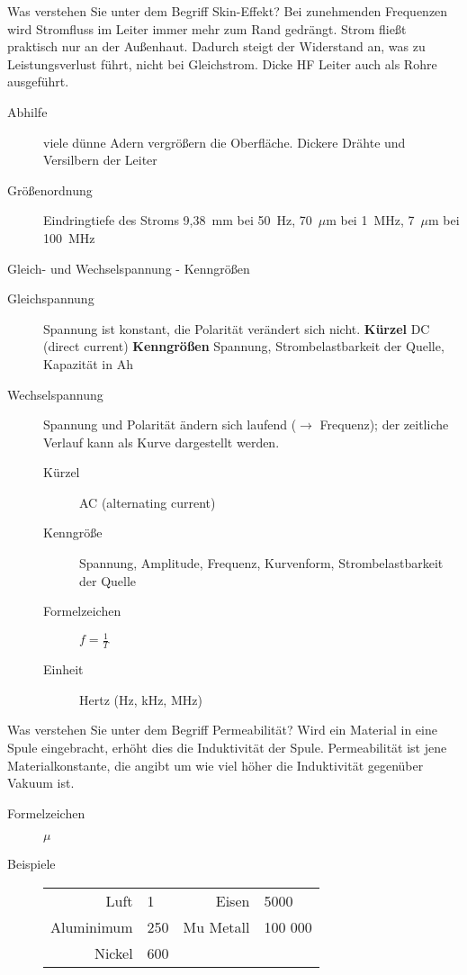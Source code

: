\documentclass[avery5371,grid,frame,a4paper]{flashcards}
\newcommand{\card}[3]{
  \begin{flashcard}[{\chap} -- #1]{#2}#3\end{flashcard}
}
\begin{document}
\card{08}{Was verstehen Sie unter dem Begriff Skin-Effekt?}{
  \small
  Bei zunehmenden Frequenzen wird Stromfluss im Leiter immer mehr zum Rand gedrängt.
  Strom fließt praktisch nur an der Außenhaut.
  Dadurch steigt der Widerstand an, was zu Leistungsverlust führt, nicht bei Gleichstrom.
  Dicke HF Leiter auch als Rohre ausgeführt.
  \begin{description}
    \item[Abhilfe] viele dünne Adern vergrößern die Oberfläche. Dickere Drähte und Versilbern der Leiter
    \item[Größenordnung] Eindringtiefe des Stroms
      9,\SI{38}{\milli\metre} bei 50~Hz, 70~$\mu$m bei 1~MHz, 7~$\mu$m bei \SI{100}{\mega\Hz}
  \end{description}
}

\card{09}{Gleich- und Wechselspannung - Kenngrößen}{
  \scriptsize
  \begin{description}
    \item[Gleichspannung] Spannung ist konstant, die Polarität verändert sich nicht. \textbf{Kürzel} DC (direct current) \textbf{Kenngrößen} Spannung, Strombelastbarkeit der Quelle, Kapazität in Ah
    \item[Wechselspannung]
      Spannung und Polarität ändern sich laufend ($\rightarrow$ Frequenz); der zeitliche Verlauf kann als Kurve dargestellt werden. 
      \begin{description}
        \item[Kürzel] AC (alternating current)
        \item[Kenngröße] Spannung, Amplitude, Frequenz, Kurvenform, Strombelastbarkeit der Quelle
        \item[Formelzeichen] $f = \frac1T$
        \item[Einheit] Hertz (Hz, kHz, MHz)
      \end{description}
  \end{description}
}


\card{10}{Was verstehen Sie unter dem Begriff Permeabilität?}{
  Wird ein Material in eine Spule eingebracht, erhöht dies die Induktivität der Spule.
  Permeabilität ist jene Materialkonstante, die angibt um wie viel höher die Induktivität
  gegenüber Vakuum ist.
  \begin{description}
    \item[Formelzeichen] $\mu$
    \item[Beispiele]
      \begin{tabular}{rlrl}
        Luft       & 1      & Eisen      & 5000 \\
        Aluminimum & 250    & Mu Metall  & 100 000 \\
        Nickel     & 600    &            & \\
      \end{tabular}
  \end{description}
}
\end{document}
